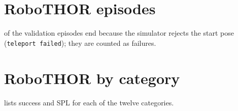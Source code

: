 \section{RoboTHOR episodes}
\nRoboErr{} of the \nRoboN{} validation episodes end because the simulator rejects the start pose
(\texttt{teleport failed}); they are counted as failures.

\section{RoboTHOR by category}
 lists success and SPL for each of the twelve categories.

\begin{table}[htbp]
\centering\small
\caption{\ours on RoboTHOR validation by target category (150 episodes each).}
\label{tab:s-robothor}

\end{table}
